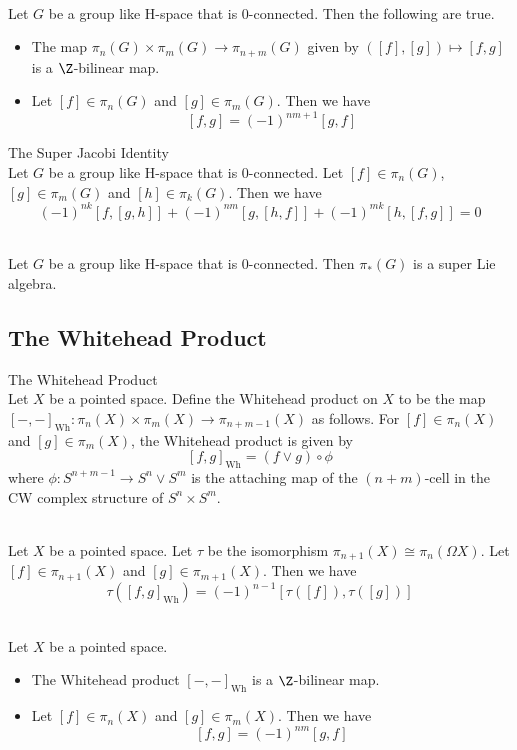 \documentclass[a4paper]{article}
\begin{document}
\begin{prp}{}{}\\
Let $G$ be a group like H-space that is $0$-connected. Then the following are true. 
\begin{itemize}
\item The map $\pi_n(G)\times\pi_m(G)\to\pi_{n+m}(G)$ given by $([f],[g])\mapsto[f,g]$ is a $\Z$-bilinear map. 
\item Let $[f]\in\pi_n(G)$ and $[g]\in\pi_m(G)$. Then we have $$[f,g]=(-1)^{nm+1}[g,f]$$
\end{itemize}
\end{prp}

\begin{prp}{The Super Jacobi Identity}{}\\
Let $G$ be a group like H-space that is $0$-connected. Let $[f]\in\pi_n(G)$, $[g]\in\pi_m(G)$ and $[h]\in\pi_k(G)$. Then we have $$(-1)^{nk}[f,[g,h]]+(-1)^{nm}[g,[h,f]]+(-1)^{mk}[h,[f,g]]=0$$
\end{prp}

\begin{crl}{}{}\\
Let $G$ be a group like H-space that is $0$-connected. Then $\pi_\ast(G)$ is a super Lie algebra. 
\end{crl}

\subsection{The Whitehead Product}
\begin{defn}{The Whitehead Product}{}\\
Let $X$ be a pointed space. Define the Whitehead product on $X$ to be the map $[-,-]_\text{Wh}:\pi_n(X)\times\pi_m(X)\to\pi_{n+m-1}(X)$ as follows. For $[f]\in\pi_n(X)$ and $[g]\in\pi_m(X)$, the Whitehead product is given by $$[f,g]_\text{Wh}=(f\vee g)\circ\phi$$ where $\phi:S^{n+m-1}\to S^n\vee S^m$ is the attaching map of the $(n+m)$-cell in the CW complex structure of $S^n\times S^m$. 
\end{defn}

\begin{prp}{}{}\\
Let $X$ be a pointed space. Let $\tau$ be the isomorphism $\pi_{n+1}(X)\cong\pi_n(\Omega X)$. Let $[f]\in\pi_{n+1}(X)$ and $[g]\in\pi_{m+1}(X)$. Then we have $$\tau([f,g]_\text{Wh})=(-1)^{n-1}[\tau([f]),\tau([g])]$$
\end{prp}

\begin{prp}{}{}\\
Let $X$ be a pointed space. 
\begin{itemize}
\item The Whitehead product $[-,-]_\text{Wh}$ is a $\Z$-bilinear map. 
\item Let $[f]\in\pi_n(X)$ and $[g]\in\pi_m(X)$. Then we have $$[f,g]=(-1)^{nm}[g,f]$$
\end{itemize}
\end{prp}
\end{document}
